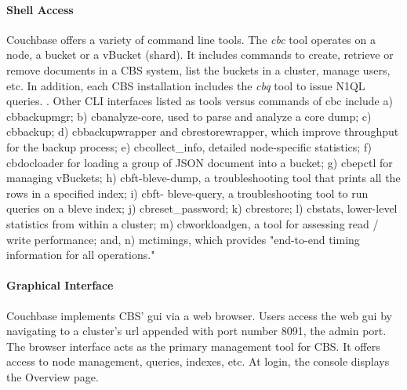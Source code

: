 \documentclass[9pt,twocolumn,twoside]{styles/osajnl}
\begin{document}
\paragraph{Shell Access} Couchbase offers a variety of command line tools.
The \textit{cbc} tool operates on a node, a bucket or a vBucket (shard).  It includes commands to create, retrieve or remove documents in a
CBS system, list the buckets in a cluster, manage users, etc.  In
addition, each CBS installation includes the \textit{cbq} tool to issue N1QL
queries. \cite{www-cli-cbsinc}. Other CLI interfaces listed as tools versus
commands of cbc include a) cbbackupmgr; b) cbanalyze-core, used to parse and
analyze a core dump; c) cbbackup; d) cbbackupwrapper and cbrestorewrapper,
which improve throughput for the backup process; e) cbcollect\_info, detailed
node-specific statistics; f) cbdocloader for loading a group of JSON document
into a bucket; g) cbepctl for managing vBuckets; h) cbft-bleve-dump, a
troubleshooting tool that prints all the rows in a specified index; i) cbft-
bleve-query, a troubleshooting tool to run queries on a bleve index; j)
cbreset\_password; k) cbrestore; l) cbstats, lower-level statistics from within
a cluster; m) cbworkloadgen, a tool for assessing read / write performance; and, n) mctimings, which provides "end-to-end timing information for all operations." \cite{www-cli-intro-cbsinc}

\paragraph{Graphical Interface} Couchbase implements CBS' gui via a web
browser.  Users access the web gui by navigating to a cluster's url appended
with port number 8091, the admin port.  The browser interface acts as the
primary management tool for CBS.  It offers access to node management, queries,
indexes, etc.  At login, the console displays the Overview page. 
\cite{www-webconsole-cbsinc}
\end{document}
